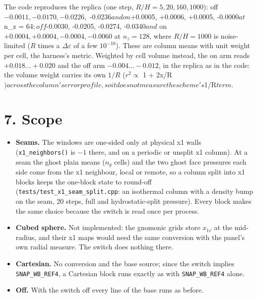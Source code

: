 \documentclass[11pt,a4paper]{article}
\begin{document}
The code reproduces the replica (one step, $R/H = 5, 20, 160, 1000$): off $-0.0011, -0.0170, -0.0226,$
-0.0236$ and on $+0.0005, +0.0006, +0.0005, -0.0000$ at $n\_z = 64$; off $-0.0030, -0.0205, -0.0274, -0.0340$ and$
on $+0.0004, +0.0004, -0.0004, -0.0060$ at $n_z = 128$, where $R/H = 1000$ is noise-limited ($R$ times a
$\Delta\varepsilon$ of a few $10^{-10}$). These are column means with unit weight per cell, the harness's
metric. Weighted by cell volume instead, the on arm reads $+0.018 \ldots +0.020$ and the off arm
$-0.004 \ldots -0.012$, in the replica as in the code: the volume weight carries its own $1/R$ ($r^2 \propto$
1 + 2x/R$) across the column's error profile, so it does not measure the scheme's $1/R$ term.$

\section*{7. Scope}

\begin{itemize}
\item \textbf{Seams.} The windows are one-sided only at physical x1 walls (\texttt{x1\_neighbors()} is $-1$ there, and on a
  periodic or unsplit x1 column). At a seam the ghost plain means ($n_g$ cells) and the two ghost face
  pressures each side come from the x1 neighbour, local or remote, so a column split into x1 blocks keeps the
  one-block state to round-off (\texttt{tests/test\_x1\_seam\_split.cpp}: an isothermal column with a density bump on
  the seam, 20 steps, full and hydrostatic-split pressure). Every block makes the same choice because the
  switch is read once per process.
\item \textbf{Cubed sphere.} Not implemented: the gnomonic grids store $x_{1v}$ at the mid-radius, and their x1 maps
  would need the same conversion with the panel's own radial measure. The switch does nothing there.
\item \textbf{Cartesian.} No conversion and the base source; since the switch implies \texttt{SNAP\_WB\_REF4}, a Cartesian block
  runs exactly as with \texttt{SNAP\_WB\_REF4} alone.
\item \textbf{Off.} With the switch off every line of the base runs as before.
\end{itemize}
\end{document}
